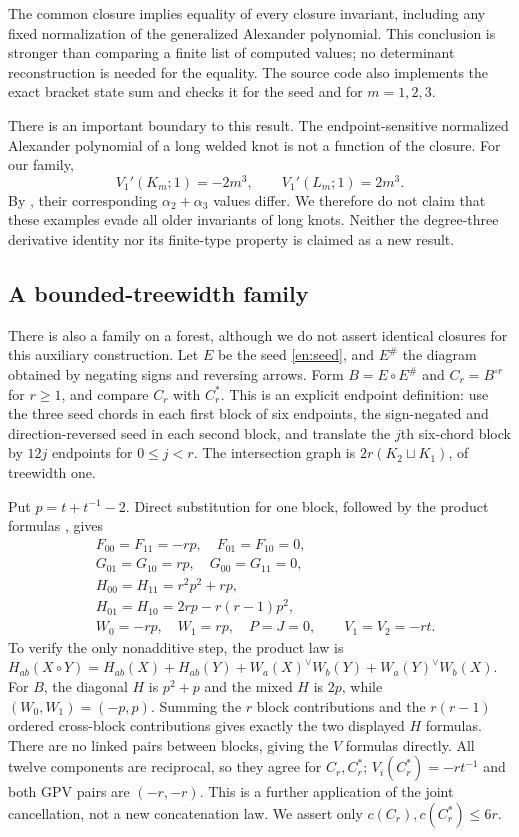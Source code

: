 \documentclass[12pt]{amsart}
\theoremstyle{definition}
\theoremstyle{remark}
\numberwithin{equation}{section}
\begin{document}
The common closure implies equality of every closure invariant, including
any fixed normalization of the generalized Alexander polynomial. This
conclusion is stronger than comparing a finite list of computed values;
no determinant reconstruction is needed for the equality. The source
code also implements the exact bracket state sum and checks it for the
seed and for $m=1,2,3$.

There is an important boundary to this result. The endpoint-sensitive
normalized Alexander polynomial of a long welded knot is not a function
of the closure. For our family,
\[
V_1'(K_m;1)=-2m^3,\qquad V_1'(L_m;1)=2m^3.
\]
By \cite[Theorem 7.4]{SW}, their corresponding $\alpha_2+\alpha_3$
values differ. We therefore do not claim that these examples evade all
older invariants of long knots. Neither the degree-three derivative
identity nor its finite-type property is claimed as a new result.

\subsection{A bounded-treewidth family}\label{en:forest}
There is also a family on a forest, although we do not assert identical
closures for this auxiliary construction. Let $E$ be the seed
\eqref{en:seed}, and $E^\#$ the diagram obtained by negating signs and
reversing arrows. Form $B=E\circ E^\#$ and $C_r=B^{\circ r}$ for $r\ge1$,
and compare $C_r$ with $C_r^*$. This is an explicit endpoint definition:
use the three seed chords in each first block of six endpoints, the
sign-negated and direction-reversed seed in each second block, and
translate the $j$th six-chord block by $12j$ endpoints for $0\le j<r$.
The intersection graph is $2r(K_2\sqcup K_1)$, of treewidth one.

Put $p=t+t^{-1}-2$. Direct substitution for one block, followed by the
product formulas \cite[Theorem 6.2]{NNSW1}, gives
\begin{align*}
&F_{00}=F_{11}=-rp,\quad F_{01}=F_{10}=0,\\
&G_{01}=G_{10}=rp,\quad G_{00}=G_{11}=0,\\
&H_{00}=H_{11}=r^2p^2+rp,\\
&H_{01}=H_{10}=2rp-r(r-1)p^2,\\
&W_0=-rp,\quad W_1=rp,\quad P=J=0,\qquad V_1=V_2=-rt.
\end{align*}
To verify the only nonadditive step, the product law is
$H_{ab}(X\circ Y)=H_{ab}(X)+H_{ab}(Y)+W_a(X)^\vee W_b(Y)
+W_a(Y)^\vee W_b(X)$. For $B$, the diagonal $H$ is $p^2+p$ and the
mixed $H$ is $2p$, while $(W_0,W_1)=(-p,p)$. Summing the $r$ block
contributions and the $r(r-1)$ ordered cross-block contributions gives
exactly the two displayed $H$ formulas. There are no linked pairs between
blocks, giving the $V$ formulas directly.
All twelve components are reciprocal, so they agree for $C_r,C_r^*$;
$V_i(C_r^*)=-rt^{-1}$ and both GPV pairs are $(-r,-r)$.
This is a further application of the joint cancellation, not a new
concatenation law. We assert only $c(C_r),c(C_r^*)\le6r$.
\end{document}
